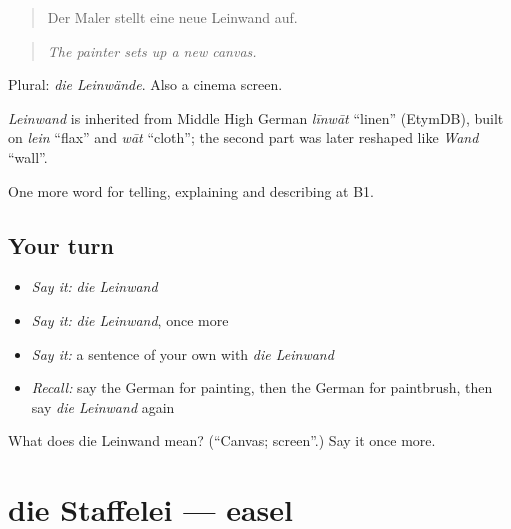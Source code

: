 \begin{quote}
Der Maler stellt eine neue Leinwand auf.
\end{quote}

\begin{quote}
\emph{The painter sets up a new canvas.}
\end{quote}

Plural: \emph{die Leinwände}. Also a cinema screen.

\begin{cousinweb}
\emph{Leinwand} is inherited from Middle High German \emph{līnwāt} \textquotedblleft{}linen\textquotedblright{} (EtymDB), built on \emph{lein} \textquotedblleft{}flax\textquotedblright{} and \emph{wāt} \textquotedblleft{}cloth\textquotedblright{}; the second part was later reshaped like \emph{Wand} \textquotedblleft{}wall\textquotedblright{}.
\end{cousinweb}

\begin{grammarlens}[title={What you've built}]
One more word for telling, explaining and describing at B1.
\end{grammarlens}

\subsection*{Your turn}
\begin{itemize}
\raggedright
  \item \emph{Say it:} \emph{die Leinwand}
  \item \emph{Say it:} \emph{die Leinwand}, once more
  \item \emph{Say it:} a sentence of your own with \emph{die Leinwand}
  \item \emph{Recall:} say the German for painting, then the German for paintbrush, then say \emph{die Leinwand} again
\end{itemize}

\begin{tcolorbox}[breakable,colback=teal!4,colframe=teal!35!black,title={Before you move on}]
What does die Leinwand mean? (\textquotedblleft{}Canvas; screen\textquotedblright{}.) Say it once more.
\end{tcolorbox}
\section[die Staffelei]{die Staffelei — easel}

\label{lesson:GE-C518-staffelei}



